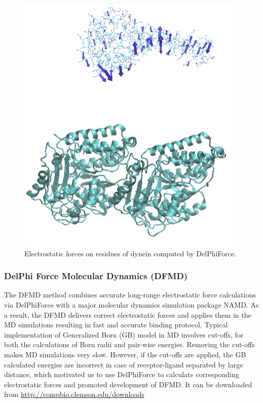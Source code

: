 \documentclass[9pt,tutorial]{livecoms}
\begin{document}
\begin{figure}[hbt!]
\includegraphics[width=\linewidth]{Figure_14.png}
\caption{Electrostatic forces on residues of dynein computed by DelPhiForce.}
\label{fig:delphiforce}
\end{figure}


\subsubsection{DelPhi Force Molecular Dynamics (DFMD)}
The DFMD method combines accurate long-range electrostatic force calculations via DelPhiForce with a major molecular dynamics simulation package NAMD\cite{phillips2005scalable}.  As a result, the DFMD delivers correct electrostatic forces and applies them in the MD simulations resulting in fast and accurate binding protocol. Typical implementation of Generalized Born (GB)\cite{onufriev2000modification} model in MD involves cut-offs, for both the calculations of Born radii and pair-wise energies. Removing the cut-offs makes MD simulations very slow. However, if the cut-offs are applied, the GB calculated energies are incorrect in case of receptor-ligand separated by large distance, which motivated us to use DelPhiForce to calculate corresponding electrostatic forces and promoted development of DFMD. It can be downloaded from \url{http://compbio.clemson.edu/downloads}
\end{document}
